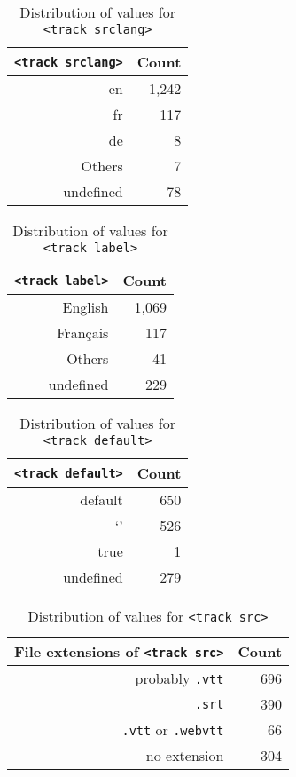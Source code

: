 \documentclass{sig-alternate-ceur}
\begin{document}
\begin{table}[b!]
  \raggedleft
  \footnotesize
  \begin{tabular}{ r | r }                       
    \texttt{<track srclang>} & Count \\
    \hline  
    en & 1,242\\
    fr & 117\\
    de & 8\\    
    Others & 7\\
    undefined & 78\\    
  \end{tabular}
  \caption{Distribution of values for
    \texttt{<track srclang>}}
  \label{table:srclang}    
\end{table}

\begin{table}[b!]
  \raggedleft
  \footnotesize  
  \begin{tabular}{ r | r }                       
    \texttt{<track label>} & Count \\
    \hline  
    English & 1,069\\
    Français & 117\\    
    Others & 41\\
    undefined & 229\\
  \end{tabular}
  \caption{Distribution of values for
    \texttt{<track label>}}
  \label{table:label}    
\end{table}
  
\begin{table}[b!]
  \raggedleft
  \footnotesize  
  \begin{tabular}{ r | r }                       
    \texttt{<track default>} & Count \\
    \hline
    default & 650\\
    `' & 526\\
    true & 1\\
    undefined & 279
  \end{tabular}
  \caption{Distribution of values for
    \texttt{<track default>}}
  \label{table:default}    
\end{table}

\begin{table}[b!]
  \raggedleft
  \footnotesize  
  \begin{tabular}{ r | r }                       
    File extensions of \texttt{<track src>} & Count \\
    \hline
    probably \texttt{.vtt} & 696\\
    \texttt{.srt} & 390\\
    \texttt{.vtt} or \texttt{.webvtt} & 66\\
    no extension & 304\\
  \end{tabular}
  \caption{Distribution of values for \texttt{<track src>}}
  \label{table:src}    
\end{table}
\end{document}
